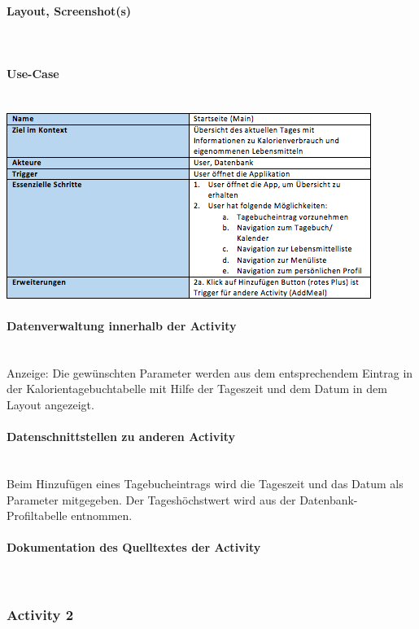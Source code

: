 \paragraph{Layout, Screenshot(s)}\\
\paragraph{Use-Case}$~~$\\
\newline
\includegraphics[scale=1]{img/usecasemain}\\
\paragraph{Datenverwaltung innerhalb der Activity}\\
Anzeige: Die gewünschten Parameter werden aus dem entsprechendem Eintrag in der Kalorientagebuchtabelle mit Hilfe der Tageszeit und dem Datum in dem Layout angezeigt.

\paragraph{Datenschnittstellen zu anderen Activity}\\
Beim Hinzufügen eines Tagebucheintrags wird die Tageszeit und das Datum als Parameter mitgegeben. Der Tageshöchstwert wird aus der Datenbank-Profiltabelle entnommen. 

\paragraph{Dokumentation des Quelltextes der Activity}\\

\subsubsection{Activity 2}

